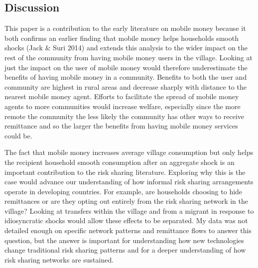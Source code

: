 \subsection{Discussion} 
This paper is a contribution to the early literature on mobile money because it both confirms an earlier finding that mobile money helps households smooth  shocks (Jack \& Suri 2014) and extends this analysis to the wider impact on the rest of the community from having mobile money users in the village. Looking at just the impact on the user of mobile money would therefore underestimate the benefits of having mobile money in a community. Benefits to both the user and community are highest in rural areas and decrease sharply with distance to the nearest mobile money agent. Efforts to facilitate the spread of mobile money agents to more communities would increase welfare, especially since the more remote the community the less likely the community has other ways to receive remittance and so the larger the benefits from having mobile money services could be. 

The fact that mobile money increases average village consumption but only helps the recipient household smooth consumption after an aggregate shock is an important contribution to the risk sharing literature. Exploring why this is the case would advance our understanding of how informal risk sharing arrangements operate in developing countries. For example, are households choosing to hide remittances or are they opting out entirely from the risk sharing network in the village? Looking at transfers within the village and from a migrant in response to idiosyncratic shocks would allow these effects to be separated. My data was not detailed enough on specific network patterns and remittance flows to answer this question, but the answer is important for understanding how new technologies change traditional risk sharing patterns and for a deeper understanding of how risk sharing networks are sustained.  


